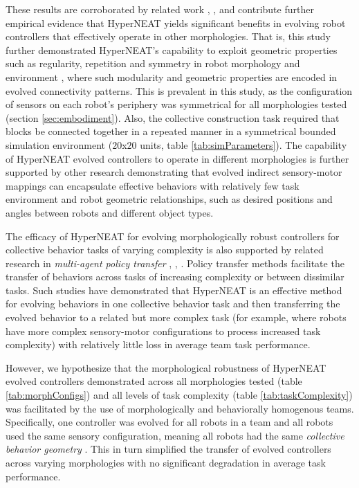 \documentclass[conference]{IEEEtran}
\begin{document}
These results are corroborated by related work \cite{RisiStanley2013}, \cite{WatsonNitschke2015SSCI},
and contribute further empirical evidence that HyperNEAT yields significant benefits in
evolving robot controllers that effectively operate in other morphologies.
That is, this study further demonstrated HyperNEAT's capability to exploit geometric properties
such as regularity, repetition and symmetry in robot morphology and environment \cite{StanleyDAmbrosioGauci2009},
where such modularity and geometric properties are encoded in evolved connectivity patterns.
This is prevalent in this study, as the configuration of sensors on each robot's periphery was
symmetrical for all morphologies tested (section \ref{sec:embodiment}).
Also, the collective construction task required that blocks be connected together in a repeated manner in a symmetrical bounded
simulation environment ($20$x$20$ units, table \ref{tab:simParameters}).
The capability of HyperNEAT evolved controllers to operate in different morphologies is further
supported by other research \cite{verbancsics_evolving_2010}
demonstrating that evolved indirect sensory-motor mappings can
encapsulate effective behaviors with relatively few task environment and robot
geometric relationships, such as desired positions and angles between robots and different object types.

The efficacy of HyperNEAT for evolving morphologically robust controllers for collective behavior
tasks of varying complexity is also supported by related research in \textit{multi-agent policy transfer}
\cite{verbancsics_evolving_2010}, \cite{DidiNitschke2016SSCI}, \cite{DidiNitschke2016}.
Policy transfer methods facilitate the transfer of behaviors across tasks of increasing
complexity or between dissimilar tasks.  Such studies have demonstrated that HyperNEAT is an effective
method for evolving behaviors in one collective behavior task and then transferring the evolved behavior
to a related but more complex task (for example, where robots have more complex sensory-motor configurations
to process increased task complexity) with relatively little loss in average team task performance.

However, we hypothesize that the morphological robustness of HyperNEAT evolved controllers demonstrated across all
morphologies tested (table \ref{tab:morphConfigs}) and all levels of task complexity
(table \ref{tab:taskComplexity}) was facilitated by the use of morphologically and behaviorally homogenous teams.
Specifically, one controller was evolved for all robots in a team and all robots used the same sensory configuration, meaning
all robots had the same \textit{collective behavior geometry} \cite{DAmbrosioLehmanStanley2010}.
This in turn simplified the transfer of evolved controllers across varying morphologies with no significant degradation
in average task performance.
\end{document}
